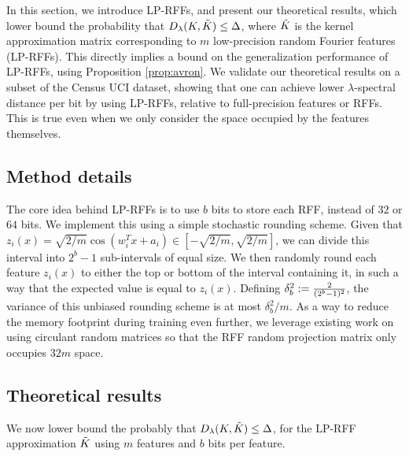 In this section, we introduce LP-RFFs, and present our theoretical results, which lower bound the probability that $D_{\lambda}(K,\tilde{K}) \leq \Delta$, where $\tilde{K}$ is the kernel approximation matrix corresponding to $m$ low-precision random Fourier features (LP-RFFs). This directly implies a bound on the generalization performance of LP-RFFs, using Proposition \ref{prop:avron}. We validate our theoretical results on a subset of the Census UCI dataset, showing that one can achieve lower $\lambda$-spectral distance per bit by using LP-RFFs, relative to full-precision \Nystrom features or RFFs.  This is true even when we only consider the space occupied by the features themselves.

\subsection{Method details}
\label{subsec:method_details}
The core idea behind LP-RFFs is to use $b$ bits to store each RFF, instead of $32$ or $64$ bits. We implement this using a simple stochastic rounding scheme. Given that $z_i(x) = \sqrt{2/m}\cos(w_i^T x + a_i) \in [-\sqrt{2/m},\sqrt{2/m}]$, we can divide this interval into $2^b - 1$ sub-intervals of equal size. We then randomly round each feature $z_i(x)$ to either the top or bottom of the interval containing it, in such a way that the expected value is equal to $z_i(x)$. Defining $\delta_b^2 := \frac{2}{(2^b-1)^2}$, the variance of this unbiased rounding scheme is at most $\delta_b^2/m$.  As a way to reduce the memory footprint during training even further, we leverage existing work on using circulant random matrices \citep{yu15} so that the RFF random projection matrix only occupies $32m$ space.

\subsection{Theoretical results}

We now lower bound the probably that $D_{\lambda}(K,\tilde{K}) \leq \Delta$, for the LP-RFF approximation $\tilde{K}$ using $m$ features and $b$ bits per feature.

